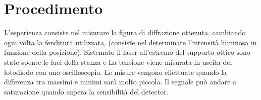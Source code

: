 \documentclass[../main.tex]{subfiles}
\begin{document}
\section{Procedimento}




L’esperienza consiste nel misurare la figura di diffrazione ottenuta, cambiando ogni volta la fenditura utilizzata, %
(consiste nel determinare l’intensità luminosa in funzione della posizione).
Sistemato il laser all’estremo del supporto ottico sono state spente le luci della stanza e %
La tensione viene misurata in uscita del fotodiodo con uno oscilloscopio. Le misure vengono effettuate quando la differenza tra massimi e minimi sarà molto piccola. Il segnale può andare a saturazione quando supera la sensibilità del detector.
\end{document}
